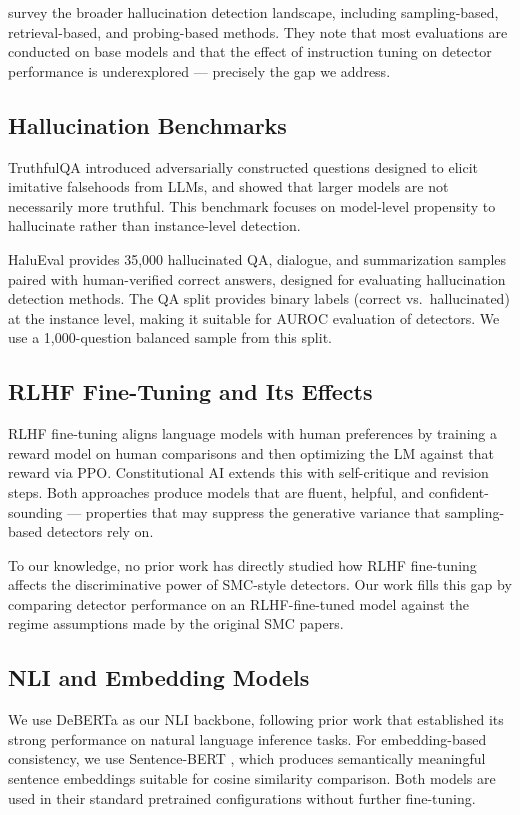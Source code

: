\cite{Huang2023Survey} survey the broader hallucination detection landscape, including sampling-based, retrieval-based, and probing-based methods. They note that most evaluations are conducted on base models and that the effect of instruction tuning on detector performance is underexplored --- precisely the gap we address.

\subsection{Hallucination Benchmarks}

TruthfulQA \cite{Lin2022TruthfulQA} introduced adversarially constructed questions designed to elicit imitative falsehoods from LLMs, and showed that larger models are not necessarily more truthful. This benchmark focuses on model-level propensity to hallucinate rather than instance-level detection.

HaluEval \cite{Li2023HaluEval} provides 35,000 hallucinated QA, dialogue, and summarization samples paired with human-verified correct answers, designed for evaluating hallucination detection methods. The QA split provides binary labels (correct vs.\ hallucinated) at the instance level, making it suitable for AUROC evaluation of detectors. We use a 1,000-question balanced sample from this split.

\subsection{RLHF Fine-Tuning and Its Effects}

RLHF fine-tuning \cite{Ouyang2022Training,Ziegler2019Fine} aligns language models with human preferences by training a reward model on human comparisons and then optimizing the LM against that reward via PPO. Constitutional AI \cite{Bai2022Training} extends this with self-critique and revision steps. Both approaches produce models that are fluent, helpful, and confident-sounding --- properties that may suppress the generative variance that sampling-based detectors rely on.

To our knowledge, no prior work has directly studied how RLHF fine-tuning affects the discriminative power of SMC-style detectors. Our work fills this gap by comparing detector performance on an RLHF-fine-tuned model against the regime assumptions made by the original SMC papers.

\subsection{NLI and Embedding Models}

We use DeBERTa \cite{He2021DeBERTa} as our NLI backbone, following prior work that established its strong performance on natural language inference tasks. For embedding-based consistency, we use Sentence-BERT \cite{Reimers2019Sentence}, which produces semantically meaningful sentence embeddings suitable for cosine similarity comparison. Both models are used in their standard pretrained configurations without further fine-tuning.
